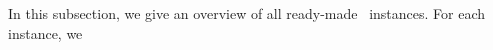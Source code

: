 %
%


In this subsection, we give an overview of all ready-made \siplibtwo\ instances. For each instance, we 


